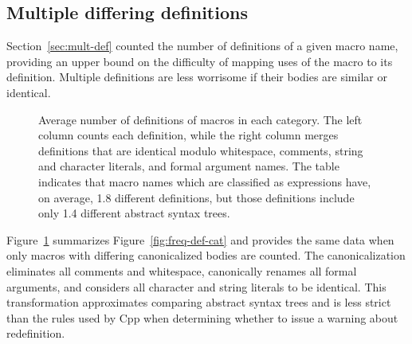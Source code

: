\documentclass[10pt]{article}
\newcommand{\captionsmall}[1]{\caption[]{\small #1}}
\begin{document}
        
\subsection{Multiple differing definitions}

Section~\ref{sec:mult-def} counted the number of definitions of a given
macro name, providing an upper bound on the difficulty of
mapping uses of the macro to its definition.  Multiple definitions are less worrisome if
their bodies are similar or identical.

        
%   

\begin{figure}
  {\small\centerline{}}
  
  \captionsmall{Average number of definitions of macros in each category.
    The left column counts each definition, while the right column merges
    definitions that are identical modulo whitespace, comments, string and
    character literals, and formal argument names.  The table indicates
    that macro names which are classified as expressions have, on average,
    1.8 different definitions, but those definitions include only 1.4
    different abstract syntax trees.}
  \label{fig:freq-sum-cat}
\end{figure}


Figure~\ref{fig:freq-sum-cat} summarizes Figure~\ref{fig:freq-def-cat} and
provides the same data when only macros with differing canonicalized bodies
are counted.  The canonicalization eliminates all comments and whitespace,
canonically renames all formal arguments, and considers all character and
string literals to be identical.  This transformation approximates comparing
abstract syntax trees and is less strict than the rules used by Cpp when
determining whether to issue a warning about redefinition.
\end{document}
